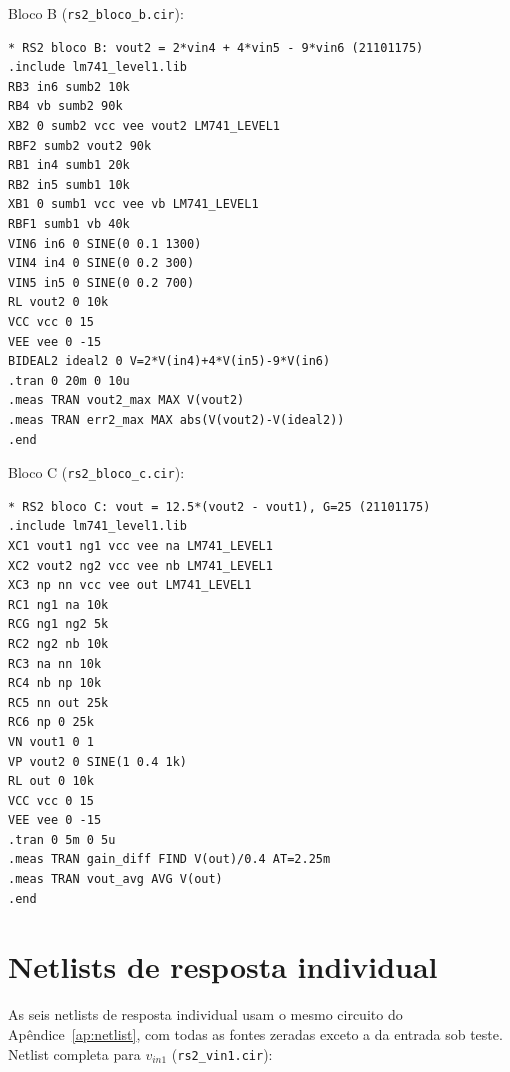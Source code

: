 Bloco B (\texttt{rs2\_bloco\_b.cir}):

{\small
\begin{verbatim}
* RS2 bloco B: vout2 = 2*vin4 + 4*vin5 - 9*vin6 (21101175)
.include lm741_level1.lib
RB3 in6 sumb2 10k
RB4 vb sumb2 90k
XB2 0 sumb2 vcc vee vout2 LM741_LEVEL1
RBF2 sumb2 vout2 90k
RB1 in4 sumb1 20k
RB2 in5 sumb1 10k
XB1 0 sumb1 vcc vee vb LM741_LEVEL1
RBF1 sumb1 vb 40k
VIN6 in6 0 SINE(0 0.1 1300)
VIN4 in4 0 SINE(0 0.2 300)
VIN5 in5 0 SINE(0 0.2 700)
RL vout2 0 10k
VCC vcc 0 15
VEE vee 0 -15
BIDEAL2 ideal2 0 V=2*V(in4)+4*V(in5)-9*V(in6)
.tran 0 20m 0 10u
.meas TRAN vout2_max MAX V(vout2)
.meas TRAN err2_max MAX abs(V(vout2)-V(ideal2))
.end
\end{verbatim}
}

Bloco C (\texttt{rs2\_bloco\_c.cir}):

{\small
\begin{verbatim}
* RS2 bloco C: vout = 12.5*(vout2 - vout1), G=25 (21101175)
.include lm741_level1.lib
XC1 vout1 ng1 vcc vee na LM741_LEVEL1
XC2 vout2 ng2 vcc vee nb LM741_LEVEL1
XC3 np nn vcc vee out LM741_LEVEL1
RC1 ng1 na 10k
RCG ng1 ng2 5k
RC2 ng2 nb 10k
RC3 na nn 10k
RC4 nb np 10k
RC5 nn out 25k
RC6 np 0 25k
VN vout1 0 1
VP vout2 0 SINE(1 0.4 1k)
RL out 0 10k
VCC vcc 0 15
VEE vee 0 -15
.tran 0 5m 0 5u
.meas TRAN gain_diff FIND V(out)/0.4 AT=2.25m
.meas TRAN vout_avg AVG V(out)
.end
\end{verbatim}
}

\section{Netlists de resposta individual}
\label{ap:individual}

As seis netlists de resposta individual usam o mesmo circuito do
Apêndice~\ref{ap:netlist}, com todas as fontes zeradas exceto a da
entrada sob teste. Netlist completa para $v_{in1}$
(\texttt{rs2\_vin1.cir}):

